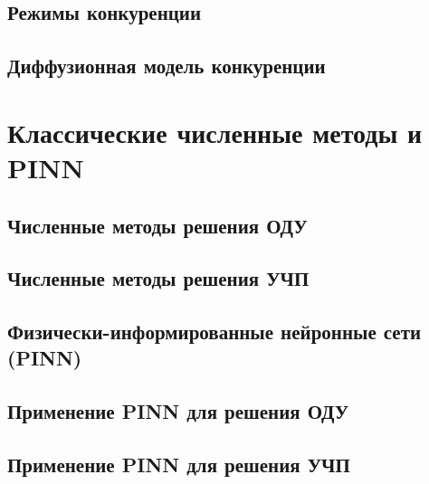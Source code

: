 
\section{Режимы конкуренции}
\label{sec:regimes}


\section{Диффузионная модель конкуренции}
\label{sec:diffusion-pde}



\chapter{Классические численные методы и PINN}
\label{ch:methods}

\section{Численные методы решения ОДУ}
\label{sec:rk-methods}


\section{Численные методы решения УЧП}
\label{sec:pde-methods}


\section{Физически-информированные нейронные сети (PINN)}
\label{sec:pinn}


\section{Применение PINN для решения ОДУ}
\label{sec:pinn-ode}


\section{Применение PINN для решения УЧП}
\label{sec:pinn-pde}

